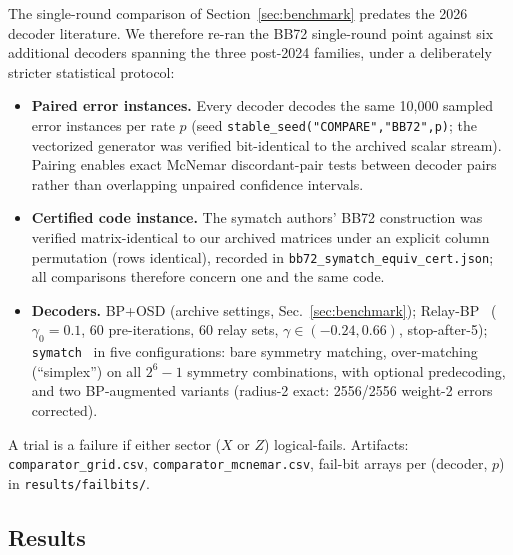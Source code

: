\documentclass[11pt,a4paper]{article}
\begin{document}
The single-round comparison of Section~\ref{sec:benchmark} predates the 2026
decoder literature. We therefore re-ran the BB72 single-round point against
six additional decoders spanning the three post-2024 families, under a
deliberately stricter statistical protocol:
\begin{itemize}
  \item \textbf{Paired error instances.} Every decoder decodes the same
  10{,}000 sampled error instances per rate $p$ (seed
  \texttt{stable\_seed("COMPARE","BB72",p)}; the vectorized generator was
  verified bit-identical to the archived scalar stream). Pairing enables
  exact McNemar discordant-pair tests between decoder pairs rather than
  overlapping unpaired confidence intervals.
  \item \textbf{Certified code instance.} The symatch authors' BB72
  construction was verified matrix-identical to our archived matrices under
  an explicit column permutation (rows identical), recorded in
  \texttt{bb72\_symatch\_equiv\_cert.json}; all comparisons therefore
  concern one and the same code.
  \item \textbf{Decoders.} BP+OSD (archive settings, Sec.~\ref{sec:benchmark});
  Relay-BP~\cite{Muller2025relay} ($\gamma_0=0.1$, 60 pre-iterations, 60
  relay sets, $\gamma\in(-0.24,0.66)$, stop-after-5);
  \texttt{symatch}~\cite{SahayBrown2026} in five configurations: bare
  symmetry matching, over-matching (``simplex'') on all $2^6-1$ symmetry
  combinations, with optional predecoding, and two BP-augmented variants
  (radius-2 exact: 2556/2556 weight-2 errors corrected).
\end{itemize}
A trial is a failure if either sector ($X$ or $Z$) logical-fails.
Artifacts: \texttt{comparator\_grid.csv}, \texttt{comparator\_mcnemar.csv},
fail-bit arrays per (decoder, $p$) in \texttt{results/failbits/}.

\subsection{Results}
\end{document}
